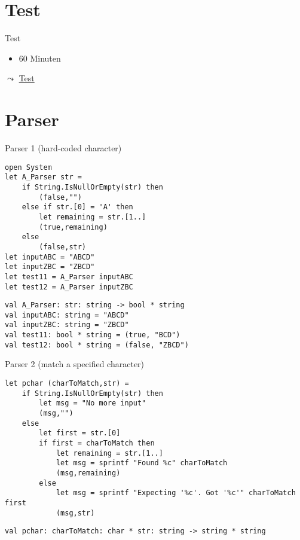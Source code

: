 \documentclass[t]{beamer}
\begin{document}
\section{Test }
\label{sec:orgc3075cb}
\begin{frame}[label={sec:org1a1c00b}]{Test}
\begin{itemize}
\item 60 Minuten
\end{itemize}

\(\leadsto\) \href{../src/test/test.md}{Test}
\end{frame}

\section{Parser }
\label{sec:org5594484}
\begin{frame}[label={sec:org750c248},fragile]{Parser 1 (hard-coded character)}
 \begin{verbatim}
open System
let A_Parser str =
    if String.IsNullOrEmpty(str) then
        (false,"")
    else if str.[0] = 'A' then
        let remaining = str.[1..]
        (true,remaining)
    else
        (false,str)
let inputABC = "ABCD"
let inputZBC = "ZBCD"
let test11 = A_Parser inputABC
let test12 = A_Parser inputZBC
\end{verbatim}

\begin{verbatim}
val A_Parser: str: string -> bool * string
val inputABC: string = "ABCD"
val inputZBC: string = "ZBCD"
val test11: bool * string = (true, "BCD")
val test12: bool * string = (false, "ZBCD")
\end{verbatim}
\end{frame}

\begin{frame}[label={sec:orgbe2c99f},fragile]{Parser 2 (match a specified character)}
 \begin{verbatim}
let pchar (charToMatch,str) =
    if String.IsNullOrEmpty(str) then
        let msg = "No more input"
        (msg,"")
    else 
        let first = str.[0] 
        if first = charToMatch then
            let remaining = str.[1..]
            let msg = sprintf "Found %c" charToMatch
            (msg,remaining)
        else
            let msg = sprintf "Expecting '%c'. Got '%c'" charToMatch first
            (msg,str)
\end{verbatim}

\begin{verbatim}
val pchar: charToMatch: char * str: string -> string * string
\end{verbatim}
\end{frame}
\end{document}

